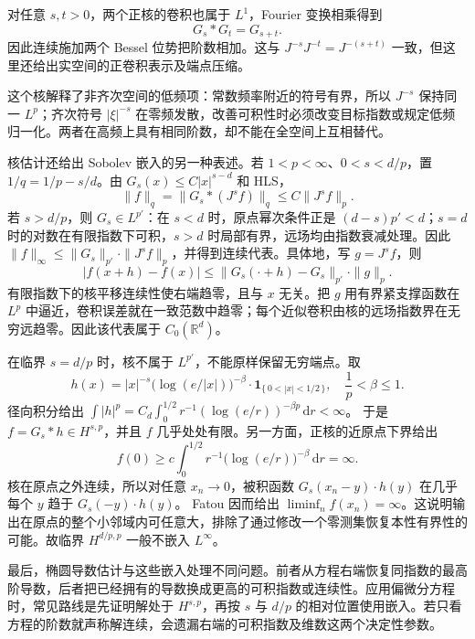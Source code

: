 \ProseParagraphBreak

对任意 \(s,t>0\)，两个正核的卷积也属于 \(L^1\)，Fourier 变换相乘得到
\[
 G_s*G_t=G_{s+t}.
\]
因此连续施加两个 Bessel 位势把阶数相加。这与 \(J^{-s}J^{-t}=J^{-(s+t)}\) 一致，但这里还给出实空间的正卷积表示及端点压缩。

\ProseParagraphBreak

这个核解释了非齐次空间的低频项：常数频率附近的符号有界，所以 \(J^{-s}\) 保持同一 \(L^p\)；齐次符号 \(|\xi|^{-s}\) 在零频发散，改善可积性时必须改变目标指数或规定低频归一化。两者在高频上具有相同阶数，却不能在全空间上互相替代。

\ProseParagraphBreak

核估计还给出 Sobolev 嵌入的另一种表述。若 \(1<p<\infty\)、\(0<s<d/p\)，置 \(1/q=1/p-s/d\)。由 \(G_s(x)\leq C|x|^{s-d}\) 和 HLS，
\[
 \|f\|_q=\|G_s*(J^sf)\|_q\leq C\|J^sf\|_p.
\]
若 \(s>d/p\)，则 \(G_s\in L^{p'}\)：在 \(s<d\) 时，原点幂次条件正是
\((d-s)p'<d\)；\(s=d\) 时的对数在有限指数下可积，\(s>d\) 时局部有界，远场均由指数衰减处理。因此
\(\|f\|_\infty\leq\|G_s\|_{p'}\cdot\|J^sf\|_p\)，并得到连续代表。具体地，写 \(g=J^sf\)，则
\[
 |f(x+h)-f(x)|
 \leq\|G_s(\cdot+h)-G_s\|_{p'}\cdot\|g\|_p.
\]
有限指数下的核平移连续性使右端趋零，且与 \(x\) 无关。把 \(g\) 用有界紧支撑函数在 \(L^p\) 中逼近，卷积误差就在一致范数中趋零；每个近似卷积由核的远场指数界在无穷远趋零。因此该代表属于 \(C_0(\mathbb R^d)\)。

\ProseParagraphBreak

在临界 \(s=d/p\) 时，核不属于 \(L^{p'}\)，不能原样保留无穷端点。取
\[
 h(x)=|x|^{-s}\bigl(\log(e/|x|)\bigr)^{-\beta}
          \cdot\mathbf1_{\{\,0<|x|<1/2\,\}},
 \quad \frac1p<\beta\leq1.
\]
径向积分给出
\(\int|h|^p=C_d\int_0^{1/2}r^{-1}(\log(e/r))^{-\beta p}\,\mathrm dr<\infty\)。
于是 \(f=G_s*h\in H^{s,p}\)，并且 \(f\) 几乎处处有限。另一方面，正核的近原点下界给出
\[
 f(0)\geq c\int_0^{1/2}
         r^{-1}\bigl(\log(e/r)\bigr)^{-\beta}\,\mathrm dr=\infty.
\]
核在原点之外连续，所以对任意 \(x_n\to0\)，被积函数
\(G_s(x_n-y)\cdot h(y)\) 在几乎每个 \(y\) 趋于 \(G_s(-y)\cdot h(y)\)。
Fatou 因而给出 \(\liminf_n f(x_n)=\infty\)。这说明输出在原点的整个小邻域内可任意大，排除了通过修改一个零测集恢复本性有界性的可能。故临界 \(H^{d/p,p}\) 一般不嵌入 \(L^\infty\)。

\ProseParagraphBreak

最后，椭圆导数估计与这些嵌入处理不同问题。前者从方程右端恢复同指数的最高阶导数，后者把已经拥有的导数换成更高的可积指数或连续性。应用偏微分方程时，常见路线是先证明解处于 \(H^{s,p}\)，再按 \(s\) 与 \(d/p\) 的相对位置使用嵌入。若只看方程的阶数就声称解连续，会遗漏右端的可积指数及维数这两个决定性参数。

